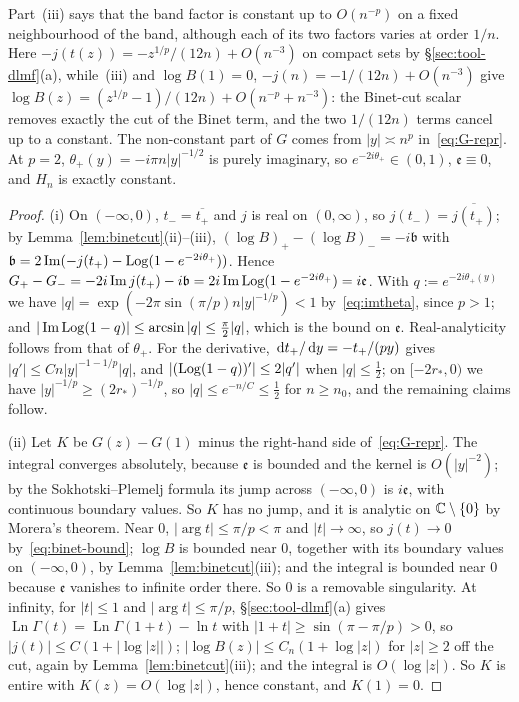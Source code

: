 Part~(iii) says that the band factor is constant up to $O(n^{-p})$ on a fixed neighbourhood of the band, although each
of its two factors varies at order $1/n$. Here $-j(t(z))=-z^{1/p}/(12n)+O(n^{-3})$ on compact sets by
\S\ref{sec:tool-dlmf}(a), while~(iii) and $\log B(1)=0$, $-j(n)=-1/(12n)+O(n^{-3})$ give $\log B(z)=(z^{1/p}-1)/(12n)+O(n^{-p}+n^{-3})$:
the Binet-cut scalar removes exactly the cut of the Binet term, and the two $1/(12n)$ terms cancel up to a constant. The
non-constant part of $G$ comes from $|y|\asymp n^p$ in~\eqref{eq:G-repr}. At $p=2$, $\theta_+(y)=-i\pi n|y|^{-1/2}$ is
purely imaginary, so $e^{-2i\theta_+}\in(0,1)$, $\mathfrak e\equiv0$, and $H_n$ is exactly constant.

\begin{proof}
(i) On $(-\infty,0)$, $t_-=\overline{t_+}$ and $j$ is real on $(0,\infty)$, so $j(t_-)=\overline{j(t_+)}$; by
Lemma~\ref{lem:binetcut}(ii)--(iii), $(\log B)_+-(\log B)_-=-i\mathfrak b$ with
$\mathfrak b=2\operatorname{Im}(-j(t_+)-\operatorname{Log}(1-e^{-2i\theta_+}))$. Hence
$G_+-G_-=-2i\operatorname{Im} j(t_+)-i\mathfrak b=2i\operatorname{Im}\operatorname{Log}(1-e^{-2i\theta_+})=i\mathfrak e$. With $q:=e^{-2i\theta_+(y)}$ we have
$|q|=\exp(-2\pi\sin(\pi/p)n|y|^{-1/p})<1$ by~\eqref{eq:imtheta}, since $p>1$; and $|\operatorname{Im}\operatorname{Log}(1-q)|\le\arcsin|q|\le\frac\pi2|q|$,
which is the bound on $\mathfrak e$. Real-analyticity follows from that of $\theta_+$. For the derivative,
$\,\mathrm{d} t_+/\,\mathrm{d} y=-t_+/(py)$ gives $|q'|\le Cn|y|^{-1-1/p}|q|$, and $|(\operatorname{Log}(1-q))'|\le2|q'|$ when $|q|\le\frac12$; on
$[-2r_*,0)$ we have $|y|^{-1/p}\ge(2r_*)^{-1/p}$, so $|q|\le e^{-n/C}\le\frac12$ for $n\ge n_0$, and the remaining
claims follow.

(ii) Let $K$ be $G(z)-G(1)$ minus the right-hand side of~\eqref{eq:G-repr}. The integral converges absolutely, because
$\mathfrak e$ is bounded and the kernel is $O(|y|^{-2})$; by the Sokhotski--Plemelj formula its jump across
$(-\infty,0)$ is $i\mathfrak e$, with continuous boundary values. So $K$ has no jump, and it is analytic on
$\mathbb{C}\setminus\{0\}$ by Morera's theorem. Near $0$, $|\arg t|\le\pi/p<\pi$ and $|t|\to\infty$, so $j(t)\to0$
by~\eqref{eq:binet-bound}; $\log B$ is bounded near $0$, together with its boundary values on $(-\infty,0)$, by
Lemma~\ref{lem:binetcut}(iii); and the integral is bounded near $0$
because $\mathfrak e$ vanishes to infinite order there. So $0$ is a removable singularity. At infinity, for $|t|\le1$
and $|\arg t|\le\pi/p$, \S\ref{sec:tool-dlmf}(a) gives $\operatorname{Ln}\Gamma(t)=\operatorname{Ln}\Gamma(1+t)-\ln t$ with
$|1+t|\ge\sin(\pi-\pi/p)>0$, so $|j(t)|\le C(1+|\log|z||)$; $|\log B(z)|\le C_n(1+\log|z|)$ for $|z|\ge2$ off the cut,
again by Lemma~\ref{lem:binetcut}(iii); and the integral is $O(\log|z|)$. So $K$ is entire with
$K(z)=O(\log|z|)$, hence constant, and $K(1)=0$.


\end{proof}
